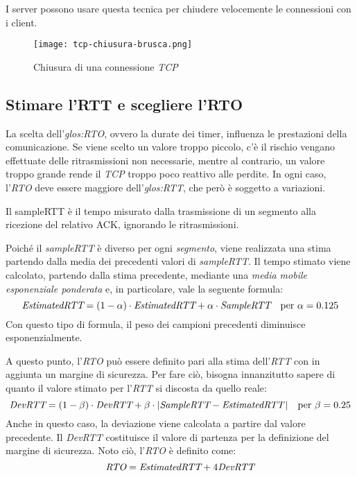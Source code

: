 \begin{note}
    I server possono usare questa tecnica per chiudere velocemente le
    connessioni con i client.
\end{note}

\begin{figure}[ht]
    \centering
    \texttt{[image: tcp-chiusura-brusca.png]}
    \caption{Chiusura  di una connessione \emph{TCP}}
\end{figure}

\subsection{Stimare l'RTT e scegliere l'RTO}
La scelta dell'\emph{\gls{glos:RTO}}, ovvero la durate dei timer, influenza le
prestazioni della comunicazione. Se viene scelto un valore troppo piccolo, c'è
il rischio vengano effettuate delle ritrasmissioni non necessarie, mentre al
contrario, un valore troppo grande rende il \emph{TCP} troppo poco reattivo
alle perdite. In ogni caso, l'\emph{RTO} deve essere maggiore
dell'\emph{\gls{glos:RTT}}, che però è soggetto a variazioni.

\begin{definition}[SampleRTT]
    Il sampleRTT è il tempo misurato dalla trasmissione di un segmento alla
    ricezione del relativo ACK, ignorando le ritrasmissioni.
\end{definition}\noindent
Poiché il \emph{sampleRTT} è diverso per ogni \emph{segmento}, viene realizzata
una stima partendo dalla media dei precedenti valori di \emph{sampleRTT}\footnotemark.
Il tempo stimato viene calcolato, partendo dalla stima precedente, mediante una
\emph{media mobile esponenziale ponderata} e, in particolare, vale la seguente
formula:
\[\emph{EstimatedRTT}=(1-\alpha)\cdot\emph{EstimatedRTT}+\alpha\cdot
\emph{SampleRTT}\quad\text{per }\alpha=0.125\]
Con questo tipo di formula, il peso dei campioni precedenti diminuisce
esponenzialmente.

A questo punto, l'\emph{RTO} può essere definito pari alla stima dell'\emph{RTT}
con in aggiunta un margine di sicurezza. Per fare ciò, bisogna innanzitutto
sapere di quanto il valore stimato per l'\emph{RTT} si discosta da quello reale:
\[\emph{DevRTT}=(1-\beta)\cdot\emph{DevRTT}+\beta\cdot|\emph{SampleRTT}-
\emph{EstimatedRTT}\,|\quad\text{per }\beta=0.25\]
Anche in questo caso, la deviazione viene calcolata a partire dal valore precedente.
Il \emph{DevRTT} costituisce il valore di partenza per la definizione del margine
di sicurezza. Noto ciò, l'\emph{RTO} è definito come:
\[\emph{RTO}=\emph{EstimatedRTT}+4\emph{DevRTT}\]

